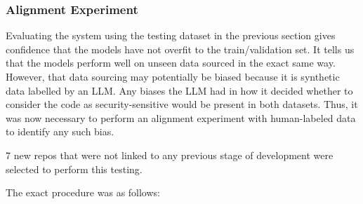 \documentclass[11pt]{article}
\begin{document}
\subsubsection{Alignment Experiment}\label{alignment-experiment}

Evaluating the system using the testing dataset in the previous section
gives confidence that the models have not overfit to the
train/validation set. It tells us that the models perform well on unseen
data sourced in the exact same way. However, that data sourcing may
potentially be biased because it is synthetic data labelled by an LLM.
Any biases the LLM had in how it decided whether to consider the code as
security-sensitive would be present in both datasets. Thus, it was now
necessary to perform an alignment experiment with human-labeled data to
identify any such bias.

7 new repos that were not linked to any previous stage of
development were selected to perform this testing.

The exact procedure was as follows:
\end{document}
